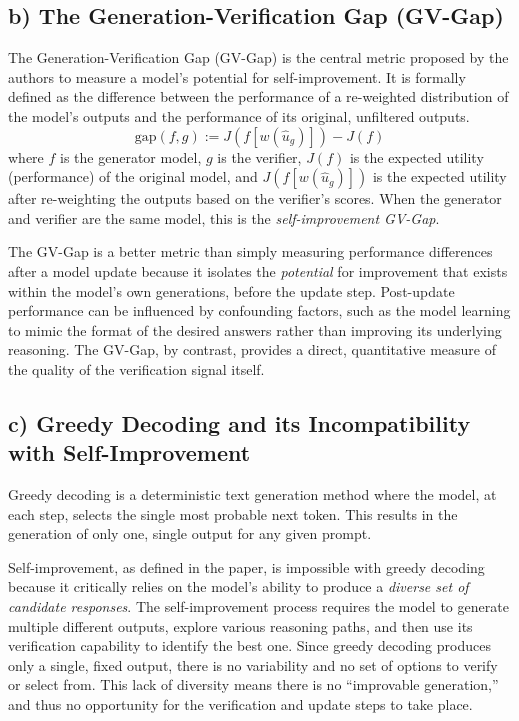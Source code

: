 \documentclass{solutionclass} %
\begin{document}
\subsection{b) The Generation-Verification Gap (GV-Gap)}
The Generation-Verification Gap (GV-Gap) is the central metric proposed by the authors to measure a model's potential for self-improvement. It is formally defined as the difference between the performance of a re-weighted distribution of the model's outputs and the performance of its original, unfiltered outputs.
\begin{equation}
    \text{gap}(f, g) := J(f[w(\hat{u}_g)]) - J(f)
\end{equation}
where $f$ is the generator model, $g$ is the verifier, $J(f)$ is the expected utility (performance) of the original model, and $J(f[w(\hat{u}_g)])$ is the expected utility after re-weighting the outputs based on the verifier's scores. When the generator and verifier are the same model, this is the \emph{self-improvement GV-Gap}.

The GV-Gap is a better metric than simply measuring performance differences after a model update because it isolates the \emph{potential} for improvement that exists within the model's own generations, before the update step. Post-update performance can be influenced by confounding factors, such as the model learning to mimic the format of the desired answers rather than improving its underlying reasoning. The GV-Gap, by contrast, provides a direct, quantitative measure of the quality of the verification signal itself.

\subsection{c) Greedy Decoding and its Incompatibility with Self-Improvement}
Greedy decoding is a deterministic text generation method where the model, at each step, selects the single most probable next token. This results in the generation of only one, single output for any given prompt.

Self-improvement, as defined in the paper, is impossible with greedy decoding because it critically relies on the model's ability to produce a \emph{diverse set of candidate responses}. The self-improvement process requires the model to generate multiple different outputs, explore various reasoning paths, and then use its verification capability to identify the best one. Since greedy decoding produces only a single, fixed output, there is no variability and no set of options to verify or select from. This lack of diversity means there is no ``improvable generation,'' and thus no opportunity for the verification and update steps to take place.
\end{document}
